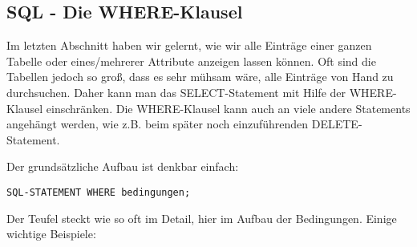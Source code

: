 \subsection[WHERE-Klausel]{SQL - Die WHERE-Klausel}\label{where}
Im letzten Abschnitt haben wir gelernt, wie wir alle Einträge einer ganzen Tabelle oder eines/mehrerer Attribute anzeigen lassen können. Oft sind die Tabellen jedoch so groß, dass es sehr mühsam wäre, alle Einträge von Hand zu durchsuchen. Daher kann man das SELECT-Statement mit Hilfe der WHERE-Klausel einschränken. Die WHERE-Klausel kann auch an viele andere Statements angehängt werden, wie z.B. beim später noch einzuführenden DELETE-Statement.

Der grundsätzliche Aufbau ist denkbar einfach:
\begin{tcolorbox}[title=WHERE-Klausel]
	\lstinline!SQL-STATEMENT WHERE bedingungen;!
\end{tcolorbox}
Der Teufel steckt wie so oft im Detail, hier im Aufbau der Bedingungen. Einige wichtige Beispiele:
